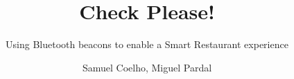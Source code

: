 \documentclass{./llncs2e/llncs}
\begin{document}
\title{Check Please!}

\subtitle{Using Bluetooth beacons to enable a Smart Restaurant experience}
\author{Samuel Coelho, Miguel Pardal}


\maketitle










\appendix





\end{document}
